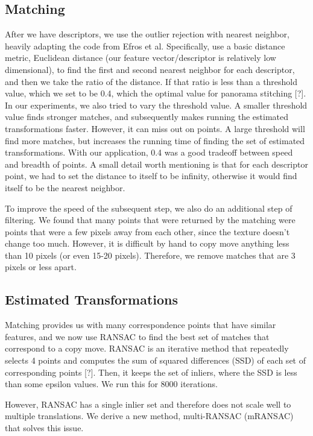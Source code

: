 \documentclass[12pt]{article}
\begin{document}
\subsection*{Matching}
After we have descriptors, we use the outlier rejection with nearest neighbor, heavily adapting the code from Efros et al.  Specifically, use a basic distance metric, Euclidean distance (our feature vector/descriptor is relatively low dimensional), to find the first and second nearest neighbor for each descriptor, and then we take the ratio of the distance. If that ratio is less than a threshold value, which we set to be 0.4, which the optimal value for panorama stitching [?]. In our experiments, we also tried to vary the threshold value. A smaller threshold value finds stronger matches, and subsequently makes running the estimated transformations faster. However, it can miss out on points. A large threshold will find more matches, but increases the running time of finding the set of estimated transformations. With our application, 0.4 was a good tradeoff between speed and breadth of points. A small detail worth mentioning is that for each descriptor point, we had to set the distance to itself to be infinity, otherwise it would find itself to be the nearest neighbor. 

To improve the speed of the subsequent step, we also do an additional step of filtering. We found that many points that were returned by the matching were points that were a few pixels away from each other, since the texture doesn't change too much. However, it is difficult by hand to copy move anything less than 10 pixels (or even 15-20 pixels). Therefore, we remove matches that are 3 pixels or less apart. 

\subsection*{Estimated Transformations}
Matching provides us with many correspondence points that have similar features, and we now use RANSAC to find the best set of matches that correspond to a copy move. RANSAC is an iterative method that repeatedly selects 4 points and computes the sum of squared differences (SSD) of each set of corresponding points [?]. Then, it keeps the set of inliers, where the SSD is less than some epsilon values. We run this for 8000 iterations. 

However, RANSAC has a single inlier set and therefore does not scale well to multiple translations. We derive a new method, multi-RANSAC (mRANSAC) that solves this issue. 
\end{document}
